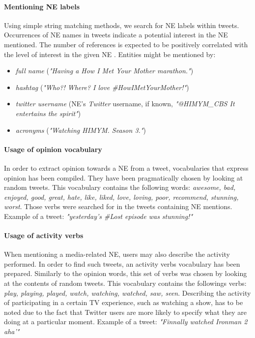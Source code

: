 \paragraph{Mentioning NE labels}
Using simple string matching methods, we search for NE labels within tweets.
Occurrences of NE names in tweets indicate a potential interest in the NE mentioned. The
number of references is expected to be positively correlated with the level of interest in the given NE \cite{twitter-content-is-it}.
Entities might be mentioned by:
\begin{itemize}
  \item \textit{full name} (\eg \textit{"Having a How I Met Your Mother marathon."})
  \item \textit{hashtag} (\eg \textit{"Who?! Where? I love \#HowIMetYourMother!"})
  \item \textit{twitter username} (NE's \textit{Twitter} username, if known, \eg \textit{"@HIMYM\_CBS It entertains the spirit"})
  \item \textit{acronyms} (\eg \textit{"Watching HIMYM. Season 3."})
\end{itemize}
\paragraph{Usage of opinion vocabulary}
In order to extract opinion towards a NE from a tweet, vocabularies that express
opinion has been compiled. They have been pragmatically chosen by looking at random tweets.
This vocabulary contains the following words: \textit{awesome, bad, enjoyed, good, great, hate,
like, liked, love, loving, poor, recommend, stunning, worst}.
Those verbs were searched for in the tweets containing NE mentions.
Example of a tweet: \textit{"yesterday's \#Lost episode was stunning!"}
\paragraph{Usage of activity verbs}
When mentioning a media-related NE, users may also describe the activity performed.
In order to find such tweets, an activity verbs vocabulary has been prepared. Similarly to
the opinion words, this set of verbs was chosen by looking at the contents of random tweets.
This vocabulary contains the followings verbs: \textit{play, playing, played, watch, watching, watched,
saw, seen}.
Describing the activity of participating in a certain TV experience, such
as watching a show, has to be noted due to the fact that Twitter users are more
likely to specify what they are doing at a particular moment.
Example of a tweet: \textit{"Finnally watched Ironman 2 aha'"}


